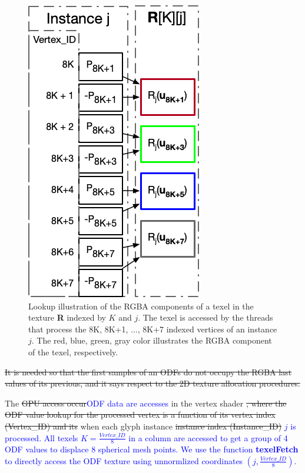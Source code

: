 \documentclass[twoside,twocolumn,10pt]{article}
\begin{document}
\begin{figure}[ht]
    \centering
    \includegraphics[width=0.7\linewidth, angle=0]{figs/rendering_scheme/texellookup.png}
    \caption{Lookup illustration of the RGBA components of a texel in the texture \textbf{R} indexed by $K$ and $j$. The texel is accessed by the threads that process the 8K, 8K+1, ..., 8K+7 indexed vertices of an instance $j$. The red, blue, green, gray color illustrates the RGBA component of the texel, respectively.}
    \label{fig::texelfetch}
\end{figure}

 \sout{It is needed so that the first samples of an ODFs do not occupy the RGBA last values of its previous, and it says respect to the 2D texture allocation procedures.} 
 
 The \sout{GPU access occur}\textcolor{blue}{ODF data are accesses} in the vertex shader \sout{, where the ODF value lookup for the processed vertex is a function of its vertex index (Vertex\_ID) and its} when each glyph instance \sout{instance index (Instance\_ID)} \textcolor{blue}{$j$ is processed. All texels $K = \frac{Vertex\_ID}{8}$ in a column are accessed to get a group of 4 ODF values to displace 8 spherical mesh points. We use the function {\bf texelFetch} to directly access the ODF texture using unnormlized coordinates $(j, \frac{Vertex\_ID}{8})$.}
\end{document}
